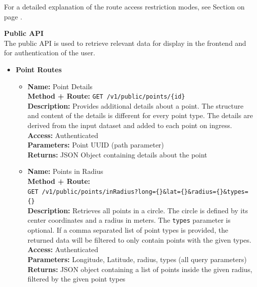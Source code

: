 For a detailed explanation of the route access restriction modes, see Section
\textbf{} on page
\pageref{middleware_route_authorisation}.

\textbf{Public API}\\
The public API is used to retrieve relevant data for display in the frontend and
for authentication of the user.

\begin{itemize}
  \item{
    \textbf{Point Routes}
    \begin{itemize}
      \item { \textbf{Name:} Point Details\\
          \textbf{Method + Route:} \texttt{GET /v1/public/points/\{id\}}\\
          \textbf{Description:} Provides additional details about a point. The
          structure and content of the details is different for every point
          type. The details are derived from the input dataset and added to each
          point on ingress.\\
          \textbf{Access:} Authenticated\\
          \textbf{Parameters:} Point UUID (path parameter)\\
          \textbf{Returns:} JSON Object containing details about the point\\
        }
      \item { \textbf{Name:} Points in Radius\\
          \textbf{Method + Route:}\\\texttt{GET
          /v1/public/points/inRadius?long=\{\}\&lat=\{\}\&radius=\{\}\&types=\{\}}\\
          \textbf{Description:} Retrieves all points in a circle. The circle is
          defined by its center coordinates and a radius in meters. The
          \texttt{types} parameter is optional. If a comma separated list of
          point types is provided, the returned data will be filtered to only
          contain points with the given types.\\
          \textbf{Access:} Authenticated\\
          \textbf{Parameters:} Longitude, Latitude, radius, types (all query
          parameters)\\
          \textbf{Returns:} JSON object containing a list of points inside the
          given radius, filtered by the given point types\\
}
\end{itemize}}
\end{itemize}
